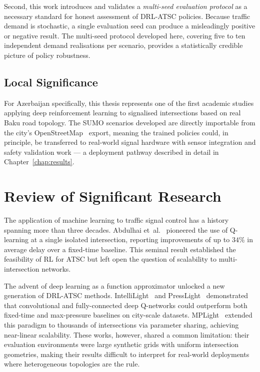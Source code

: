 \documentclass[12pt,oneside,a4paper]{report}
\begin{document}
Second, this work introduces and validates a \emph{multi-seed
evaluation protocol} as a necessary standard for honest assessment
of DRL-ATSC policies.  Because traffic demand is stochastic, a
single evaluation seed can produce a misleadingly positive or
negative result.  The multi-seed protocol developed here, covering
five to ten independent demand realisations per scenario, provides
a statistically credible picture of policy robustness.

\subsection*{Local Significance}

For Azerbaijan specifically, this thesis represents one of the first
academic studies applying deep reinforcement learning to signalised
intersections based on real Baku road topology.  The SUMO scenarios
developed are directly importable from the city's OpenStreetMap~\cite{openstreetmap2008}
export, meaning the trained policies could, in principle, be
transferred to real-world signal hardware with sensor integration
and safety validation work --- a deployment pathway described in
detail in Chapter~\ref{chap:results}.

\section{Review of Significant Research}
\label{sec:review_intro}

The application of machine learning to traffic signal control has
a history spanning more than three decades.  Abdulhai
et~al.~\cite{abdulhai2003} pioneered the use of Q-learning at a
single isolated intersection, reporting improvements of up to $34\%$
in average delay over a fixed-time baseline.  This seminal result
established the feasibility of RL for ATSC but left open the
question of scalability to multi-intersection networks.

The advent of deep learning as a function approximator unlocked a
new generation of DRL-ATSC methods.  IntelliLight~\cite{intellilight2018}
and PressLight~\cite{presslight2019} demonstrated that convolutional
and fully-connected deep Q-networks could outperform both fixed-time
and max-pressure baselines on city-scale datasets.  MPLight~\cite{mplight2020}
extended this paradigm to thousands of intersections via parameter
sharing, achieving near-linear scalability.  These works, however,
shared a common limitation: their evaluation environments were
large synthetic grids with uniform intersection geometries, making
their results difficult to interpret for real-world deployments
where heterogeneous topologies are the rule.
\end{document}
